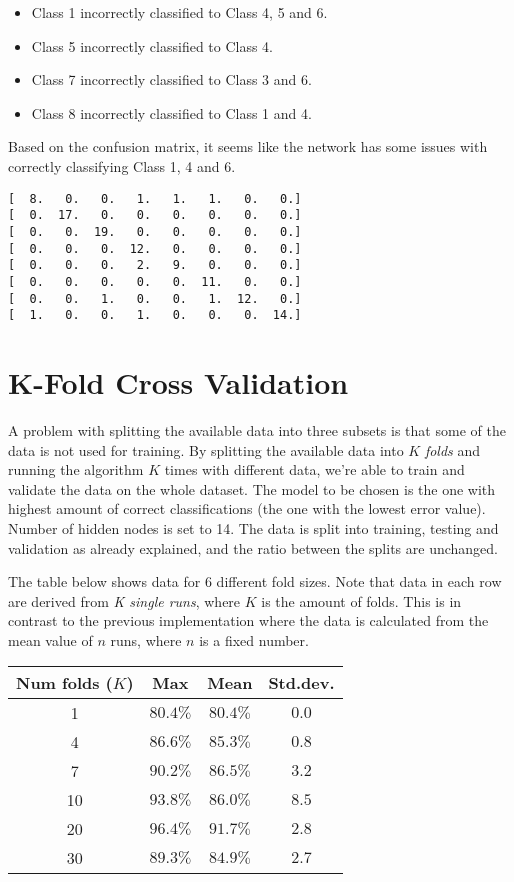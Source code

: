 \documentclass{article}
\begin{document}
\begin{itemize}
    \item Class 1 incorrectly classified to Class 4, 5 and 6.
    \item Class 5 incorrectly classified to Class 4.
    \item Class 7 incorrectly classified to Class 3 and 6.
    \item Class 8 incorrectly classified to Class 1 and 4.
\end{itemize}

\noindent Based on the confusion matrix, it seems like the network has some issues with correctly classifying Class 1, 4 and 6.

\begin{center}
\begin{verbatim}
[  8.   0.   0.   1.   1.   1.   0.   0.]
[  0.  17.   0.   0.   0.   0.   0.   0.]
[  0.   0.  19.   0.   0.   0.   0.   0.]
[  0.   0.   0.  12.   0.   0.   0.   0.]
[  0.   0.   0.   2.   9.   0.   0.   0.]
[  0.   0.   0.   0.   0.  11.   0.   0.]
[  0.   0.   1.   0.   0.   1.  12.   0.]
[  1.   0.   0.   1.   0.   0.   0.  14.]
\end{verbatim}
\end{center}

\section*{K-Fold Cross Validation}

A problem with splitting the available data into three subsets is that some of the data is not used for training. By splitting the available data into $K$ \emph{folds} and running the algorithm $K$ times with different data, we're able to train and validate the data on the whole dataset. The model to be chosen is the one with highest amount of correct classifications (the one with the lowest error value). Number of hidden nodes is set to 14. The data is split into training, testing and validation as already explained, and the ratio between the splits are unchanged.

The table below shows data for 6 different fold sizes. Note that data in each row are derived from \emph{K single runs}, where $K$ is the amount of folds. This is in contrast to the previous implementation where the data is calculated from the mean value of $n$ runs, where $n$ is a fixed number.

\begin{center}
\begin{tabular}{cccc}
\toprule
Num folds ($K$) & Max & Mean & Std.dev. \\
\midrule
1 & $80.4\%$ & $80.4\%$ & $0.0$\\
4 & $86.6\%$ & $85.3\%$ & $0.8$\\
7 & $90.2\%$ & $86.5\%$ & $3.2$\\
10 & $93.8\%$ & $86.0\%$ & $8.5$\\
20 & $96.4\%$ & $91.7\%$ & $2.8$\\
30 & $89.3\%$ & $84.9\%$ & $2.7$\\
\bottomrule
\end{tabular}
\end{center}
\end{document}
